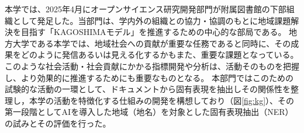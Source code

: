 本学では、2025年4月にオープンサイエンス研究開発部門が附属図書館の下部組織として発足した\cite{kgos1}。当部門は、学内外の組織との協力・協調のもとに地域課題解決を目指す「KAGOSHIMAモデル」\cite{kglib1}を推進するための中心的な部局である。
地方大学である本学では、地域社会への貢献が重要な任務であると同時に、その成果をどのように発信あるいは見える化するかもまた、重要な課題となっている。このような社会活動・社会貢献にかかる指標開発や分析は、活動そのものを把握し、より効果的に推進するためにも重要なものとなる。
本部門ではこのための試験的な活動の一環として、ドキュメントから固有表現を抽出しその関係性を整理し，本学の活動を特徴化する仕組みの開発を構想しており（図\ref{fig:kg}）、その第一段階としてAIを導入した地域（地名）を対象とした固有表現抽出（NER）の試みとその評価を行った。

